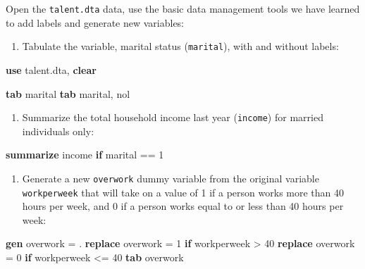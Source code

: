 \documentclass[
]{book}
\newenvironment{Shaded}{\begin{snugshade}}{\end{snugshade}}
\newcommand{\KeywordTok}[1]{\textcolor[rgb]{0.13,0.29,0.53}{\textbf{#1}}}
\newcommand{\NormalTok}[1]{#1}
\providecommand{\tightlist}{%
  \setlength{\itemsep}{0pt}\setlength{\parskip}{0pt}}
\begin{document}
\begin{alert}

Open the \texttt{talent.dta} data, use the basic data management tools we have learned to add labels and generate new variables:

\begin{enumerate}
\def\labelenumi{\arabic{enumi}.}
\tightlist
\item
  Tabulate the variable, marital status (\texttt{marital}), with and without labels:
\end{enumerate}

\begin{Shaded}
\begin{Highlighting}[]
\KeywordTok{use}\NormalTok{ talent.dta, }\KeywordTok{clear}

\KeywordTok{tab}\NormalTok{ marital}
\KeywordTok{tab}\NormalTok{ marital, nol }
\end{Highlighting}
\end{Shaded}

\begin{enumerate}
\def\labelenumi{\arabic{enumi}.}
\setcounter{enumi}{1}
\tightlist
\item
  Summarize the total household income last year (\texttt{income}) for married individuals only:
\end{enumerate}

\begin{Shaded}
\begin{Highlighting}[]
\KeywordTok{summarize}\NormalTok{ income }\KeywordTok{if}\NormalTok{ marital == 1}
\end{Highlighting}
\end{Shaded}

\begin{enumerate}
\def\labelenumi{\arabic{enumi}.}
\setcounter{enumi}{2}
\tightlist
\item
  Generate a new \texttt{overwork} dummy variable from the original variable \texttt{workperweek} that will take on a value of 1 if a person works more than 40 hours per week, and 0 if a person works equal to or less than 40 hours per week:
\end{enumerate}

\begin{Shaded}
\begin{Highlighting}[]
\KeywordTok{gen}\NormalTok{ overwork = .}
\KeywordTok{replace}\NormalTok{ overwork = 1 }\KeywordTok{if}\NormalTok{ workperweek \textgreater{} 40}
\KeywordTok{replace}\NormalTok{ overwork = 0 }\KeywordTok{if}\NormalTok{ workperweek \textless{}= 40}
\KeywordTok{tab}\NormalTok{ overwork}
\end{Highlighting}
\end{Shaded}


\end{alert}
\end{document}
